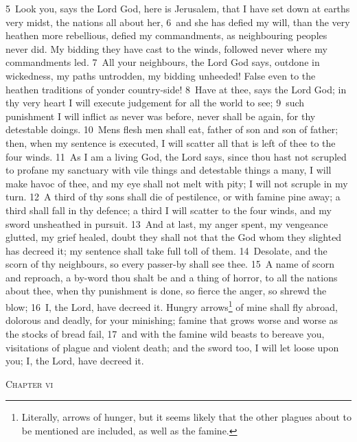 \documentclass[10pt]{book} %
\begin{document}
\textcolor{benred8}{5}~Look you, says the Lord God, here is Jerusalem, that I have set down at earth\textquotesingle s very midst, the nations all about her, \textcolor{benred8}{6}~and she has defied my will, than the very heathen more rebellious, defied my commandments, as neighbouring peoples never did. My bidding they have cast to the winds, followed never where my commandments led. \textcolor{benred8}{7}~All your neighbours, the Lord God says, outdone in wickedness, my paths untrodden, my bidding unheeded! False even to the heathen traditions of yonder country-side! \textcolor{benred8}{8}~Have at thee, says the Lord God; in thy very heart I will execute judgement for all the world to see; \textcolor{benred8}{9}~such punishment I will inflict as never was before, never shall be again, for thy detestable doings. \textcolor{benred8}{10}~Men\textquotesingle s flesh men shall eat, father of son and son of father; then, when my sentence is executed, I will scatter all that is left of thee to the four winds.
\textcolor{benred8}{11}~As I am a living God, the Lord says, since thou hast not scrupled to profane my sanctuary with vile things and detestable things a many, I will make havoc of thee, and my eye shall not melt with pity; I will not scruple in my turn. \textcolor{benred8}{12}~A third of thy sons shall die of pestilence, or with famine pine away; a third shall fall in thy defence; a third I will scatter to the four winds, and my sword unsheathed in pursuit. \textcolor{benred8}{13}~And at last, my anger spent, my vengeance glutted, my grief healed, doubt they shall not that the God whom they slighted has decreed it; my sentence shall take full toll of them. \textcolor{benred8}{14}~Desolate, and the scorn of thy neighbours, so every passer-by shall see thee. \textcolor{benred8}{15}~A name of scorn and reproach, a by-word thou shalt be and a thing of horror, to all the nations about thee, when thy punishment is done, so fierce the anger, so shrewd the blow; \textcolor{benred8}{16}~I, the Lord, have decreed it. Hungry arrows\footnote[2]{Literally, \textasciigrave arrows of hunger\textquotesingle , but it seems likely that the other plagues about to be mentioned are included, as well as the famine.} of mine shall fly abroad, dolorous and deadly, for your minishing; famine that grows worse and worse as the stocks of bread fail, \textcolor{benred8}{17}~and with the famine wild beasts to bereave you, visitations of plague and violent death; and the sword too, I will let loose upon you; I, the Lord, have decreed it.
\begin{large}\begin{center}\textsc{Chapter vi}\end{center}\end{large}
\end{document}
